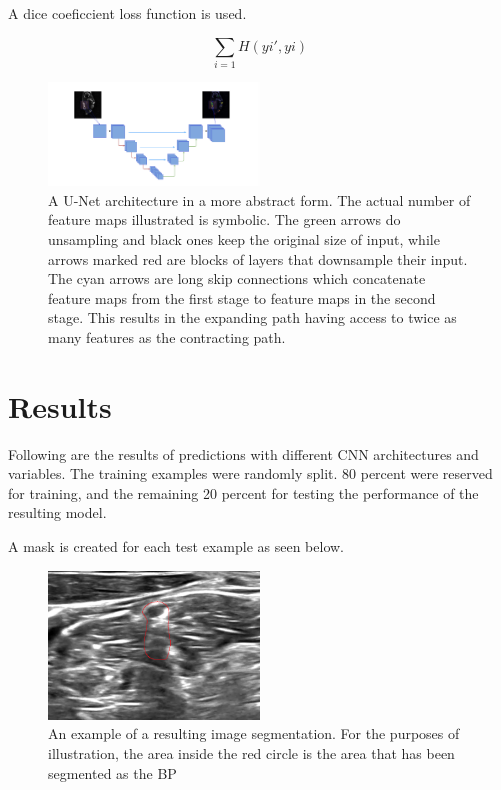 \documentclass[letterpaper]{article}
\begin{document}
A dice coeficcient loss function is used. 

$$\sum_{i=1} H(yi', yi)$$

 \begin{figure}[H]
  \centerline{\includegraphics[width=0.5\textwidth]{Images/UNETMedical.png}}
  \caption{A U-Net architecture in a more abstract form. The actual number of feature maps illustrated is symbolic. The green arrows do unsampling and black ones keep the original size of input, while arrows marked red are blocks of layers that downsample their input. The cyan arrows are long skip connections which concatenate feature maps from the first stage to feature maps in the second stage. This results in the expanding path having access to twice as many features as the contracting path.}
  \label{fig:kerasunet3}
\end{figure}



\section{Results}
Following are the results of predictions with different CNN architectures and variables.
The training examples were randomly split. 80 percent were reserved for training, and the remaining 20 percent for testing the performance of the resulting model.

A mask is created for each test example as seen below.

 \begin{figure}[H]
  \centerline{\includegraphics[width=0.5\textwidth]{Images/SegmentExample1.png}}
  \caption{An example of a resulting image segmentation. For the purposes of illustration, the area inside the red circle is the area that has been segmented as the BP}
  \label{fig:BPSegmentation1}
\end{figure}
\end{document}
